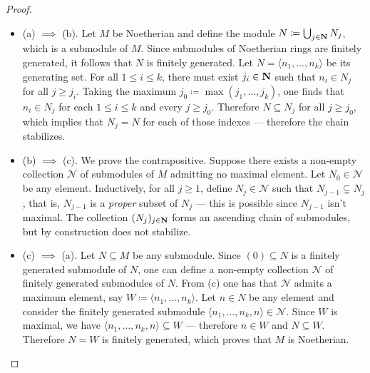 \begin{proof}
    \begin{itemize}\setlength\itemsep{0em}
        \item (a) \(\implies\) (b). Let \(M\) be Noetherian and define the module
              \(N \coloneq \bigcup_{j \in \mathbf{N}} N_j\), which is a submodule of \(M\). Since
              submodules of Noetherian rings are finitely generated, it follows that \(N\)
              is finitely generated. Let \(N = \langle n_1, \dots, n_k \rangle\) be its
              generating set. For all \(1 \leq i \leq k\), there must exist \(j_i \in \mathbf{N}\)
              such that \(n_i \in N_j\) for all \(j \geq j_i\). Taking the maximum
              \(j_0 \coloneq \max(j_1, \dots, j_k)\), one finds that \(n_i \in N_j\) for
              each \(1 \leq i \leq k\) and every \(j \geq j_0\). Therefore
              \(N \subseteq N_j\) for all \(j \geq j_0\), which implies that \(N_j = N\) for
              each of those indexes --- therefore the chain stabilizes.

        \item (b) \(\implies\) (c). We prove the contrapositive. Suppose there exists a
              non-empty collection \(\mathcal{N}\) of submodules of \(M\) admitting no
              maximal element. Let \(N_0 \in \mathcal{N}\) be any element. Inductively, for
              all \(j \geq 1\), define \(N_j \in \mathcal{N}\) such that \(N_{j-1}
              \subsetneq N_j\), that is, \(N_{j-1}\) is a \emph{proper} subset of \(N_j\)
              --- this is possible since \(N_{j-1}\) isn't maximal. The collection
              \((N_j)_{j \in \mathbf{N}}\) forms an ascending chain of submodules, but by
              construction does not stabilize.

        \item (c) \(\implies\) (a). Let \(N \subseteq M\) be any submodule. Since
              \((0) \subseteq N\) is a finitely generated submodule of \(N\), one can define
              a non-empty collection \(\mathcal{N}\) of finitely generated submodules of
              \(N\). From (c) one has that \(\mathcal{N}\) admits a maximum element, say
              \(W \coloneq \langle n_1, \dots, n_k \rangle\). Let \(n \in N\) be any element
              and consider the finitely generated submodule \(\langle n_1, \dots, n_k, n
              \rangle \in \mathcal{N}\). Since \(W\) is maximal, we have \(\langle n_1,
              \dots, n_k, n \rangle \subseteq W\) --- therefore \(n \in W\) and \(N
              \subseteq W\). Therefore \(N = W\) is finitely generated, which proves that
              \(M\) is Noetherian.
    \end{itemize}
\end{proof}

